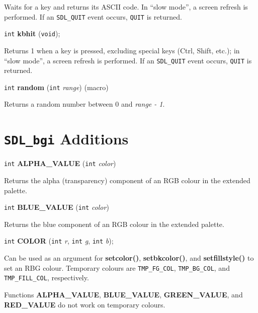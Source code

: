 \documentclass[a4paper,11pt]{article}
\newcommand{\SDLbgi}{\texttt{SDL\_bgi}}
\newcommand{\V}{\texttt{void}}      %
\newcommand{\I}{\texttt{int}}       %
\newcommand{\func}[1]{\textbf{#1}}  %
\newcommand{\A}[1]{\emph{#1}}       %
\newcommand{\T}[1]{\texttt{#1}}     %
\newenvironment{bgi}
{ %
  \begin{snugshade}
}
{ %
  \end{snugshade}
}
\begin{document}
Waits for a key and returns its ASCII code. In ``slow mode'', a screen
refresh is performed. If an \T{SDL\_QUIT} event occurs, \T{QUIT} is
returned.


\begin{bgi}
\I{} \func{kbhit} (\V{});
\end{bgi}

Returns 1 when a key is pressed, excluding special keys (Ctrl, Shift,
etc.); in ``slow mode'', a screen refresh is performed. If an
\T{SDL\_QUIT} event occurs, \T{QUIT} is returned.


\begin{bgi}
\I{} \func{random} (\I{} \A{range}) (macro)
\end{bgi}

Returns a random number between 0 and \A{range - 1}.


\section{\SDLbgi{} Additions}

\begin{bgi}
\I{} \func{ALPHA\_VALUE} (\I{} \A{color})
\end{bgi}

Returns the alpha (transparency) component of an RGB colour in the
extended palette.



\begin{bgi}
\I{} \func{BLUE\_VALUE} (\I{} \A{color})
\end{bgi}

Returns the blue component of an RGB colour in the extended palette.


\begin{bgi}
\I{} \func{COLOR} (\I{} \A{r}, \I{} \A{g}, \I{} \A{b});
\end{bgi}

Can be used as an argument for \func{setcolor()}, \func{setbkcolor()},
and \func{setfillstyle()} to set an RBG colour. Temporary colours are
\T{TMP\_FG\_COL}, \T{TMP\_BG\_COL}, and \T{TMP\_FILL\_COL},
respectively.

Functions \func{ALPHA\_VALUE}, \func{BLUE\_VALUE},
\func{GREEN\_VALUE}, and \func{RED\_VALUE} do not work on temporary
colours.

\end{document}
